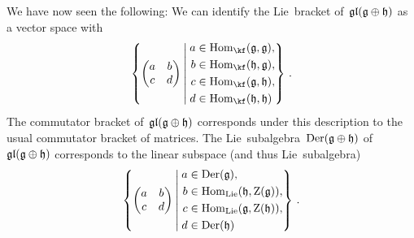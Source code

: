 \begin{example}
	We have now seen the following:
	We can identify the Lie~bracket of~$\mathfrak{gl}( \mathfrak{g} \oplus \mathfrak{h})$ as a vector space with
	\[
		\left\{
			\begin{pmatrix}
				a & b \\
				c & d
			\end{pmatrix}
		\suchthat*
			\begin{aligned}
				a &\in \Hom_{\kf}(\glie, \glie),  \\
				b &\in \Hom_{\kf}(\hlie, \glie),  \\
				c &\in \Hom_{\kf}(\glie, \hlie),  \\
				d &\in \Hom_{\kf}(\hlie, \hlie)   \\
			\end{aligned}
		\right\} \,.
	\]
	The commutator bracket of~$\mathfrak{gl}( \mathfrak{g} \oplus \mathfrak{h} )$ corresponds under this description to the usual commutator bracket of matrices.
	The Lie~subalgebra~$\operatorname{Der}(\mathfrak{g} \oplus \mathfrak{h})$ of~$\mathfrak{gl}( \mathfrak{g} \oplus \mathfrak{h} )$ corresponds to the linear subspace (and thus Lie~subalgebra)
	\[
		\left\{
			\begin{pmatrix}
				a & b \\
				c & d
			\end{pmatrix}
		\suchthat*
			\begin{aligned}
				a &\in \Der(\glie),                           \\
				b &\in \Hom_{\Lie}(\hlie, \centerlie(\glie)), \\
				c &\in \Hom_{\Lie}(\glie, \centerlie(\hlie)), \\
				d &\in \Der(\hlie)
			\end{aligned}
		\right\} \,.
	\]
\end{example}


